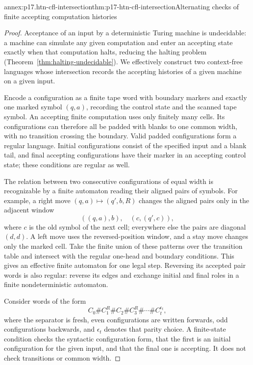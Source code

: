 \begin{annexitem}{annex:p17.htn-cfl-intersection}{thm:p17-htn-cfl-intersection}{Alternating checks of finite accepting computation histories}
\begin{proof}
Acceptance of an input by a deterministic Turing machine is undecidable:
a machine can simulate any given computation and enter an accepting state
exactly when that computation halts, reducing the halting problem
(Theorem~\ref{thm:halting-undecidable}). We effectively construct two
context-free languages whose intersection records the accepting histories
of a given machine on a given input.

Encode a configuration as a finite tape word with boundary markers and
exactly one marked symbol \((q,a)\), recording the control state and the
scanned tape symbol. An accepting finite computation uses only finitely
many cells. Its configurations can therefore all be padded with blanks to
one common width, with no transition crossing the boundary. Valid padded
configurations form a regular language. Initial configurations consist of
the specified input and a blank tail, and final accepting configurations
have their marker in an accepting control state; these conditions are
regular as well.

The relation between two consecutive configurations of equal width is
recognizable by a finite automaton reading their aligned pairs of symbols.
For example, a right move \((q,a)\mapsto(q',b,R)\) changes the aligned
pairs only in the adjacent window
\[
 ((q,a),b),\quad(c,(q',c)),
\]
where \(c\) is the old symbol of the next cell; everywhere else the pairs
are diagonal \((d,d)\). A left move uses the reversed-position window,
and a stay move changes only the marked cell. Take the finite union of
these patterns over the transition table and intersect with the regular
one-head and boundary conditions. This gives an effective finite automaton
for one legal step. Reversing its accepted pair words is also regular:
reverse its edges and exchange initial and final roles in a finite
nondeterministic automaton.

Consider words of the form
\[
 C_0\#C_1^R\#C_2\#C_3^R\#\cdots\#C_t^{\epsilon_t},
\]
where the separator is fresh, even configurations are written forwards,
odd configurations backwards, and \(\epsilon_t\) denotes that parity
choice. A finite-state condition checks the syntactic configuration form,
that the first is an initial configuration for the given input, and that
the final one is accepting. It does not check transitions or common width.


\end{proof}
\end{annexitem}
